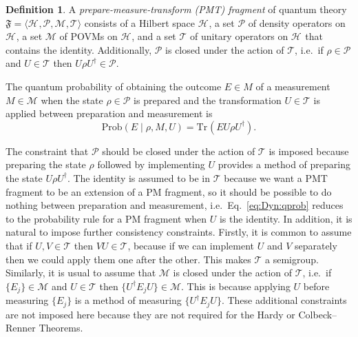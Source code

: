 \documentclass[DIV=calc,fontsize=12pt]{scrartcl} %
\theoremstyle{definition}
\newtheorem{definition}{Definition}[section]
\theoremstyle{plain}
\newcommand{\Hilb}[1][]{\ensuremath{\mathcal{H}_{#1}}}
\newcommand{\Tr}[2][]{\ensuremath{\text{Tr}_{#1} \left ( #2 \right )}}
\begin{document}
\begin{definition}
A \emph{prepare-measure-transform (PMT) fragment} of quantum theory
$\mathfrak{F} = \langle \Hilb, \mathcal{P}, \mathcal{M}, \mathcal{T}
\rangle$ consists of a Hilbert space $\Hilb$, a set $\mathcal{P}$ of
density operators on $\Hilb$, a set $\mathcal{M}$ of POVMs on
$\Hilb$, and a set $\mathcal{T}$ of unitary operators on $\Hilb$
that contains the identity.  Additionally, $\mathcal{P}$ is closed
under the action of $\mathcal{T}$, i.e.\ if $\rho \in \mathcal{P}$
and $U \in \mathcal{T}$ then $U \rho U^{\dagger} \in \mathcal{P}$.

The quantum probability of obtaining the outcome $E \in M$ of a
measurement $M \in \mathcal{M}$ when the state $\rho \in
\mathcal{P}$ is prepared and the transformation $U \in \mathcal{T}$
is applied between preparation and measurement is
\begin{equation}
\label{eq:Dyn:qprob}
\text{Prob} \left ( E \middle | \rho, M, U \right ) = \Tr{E U \rho
U^{\dagger}}.
\end{equation}
\end{definition}

The constraint that $\mathcal{P}$ should be closed under the action of
$\mathcal{T}$ is imposed because preparing the state $\rho$ followed
by implementing $U$ provides a method of preparing the state $U \rho
U^{\dagger}$.  The identity is assumed to be in $\mathcal{T}$ because
we want a PMT fragment to be an extension of a PM fragment, so it
should be possible to do nothing between preparation and measurement,
i.e.\ Eq.~\eqref{eq:Dyn:qprob} reduces to the probability rule for a
PM fragment when $U$ is the identity.  In addition, it is natural to
impose further consistency constraints. Firstly, it is common to
assume that if $U,V \in \mathcal{T}$ then $VU \in \mathcal{T}$,
because if we can implement $U$ and $V$ separately then we could apply
them one after the other.  This makes $\mathcal{T}$ a semigroup.
Similarly, it is usual to assume that $\mathcal{M}$ is closed under
the action of $\mathcal{T}$, i.e.\ if $\{E_j\} \in \mathcal{M}$ and $U
\in \mathcal{T}$ then $\{U^{\dagger} E_j U\} \in \mathcal{M}$.  This
is because applying $U$ before measuring $\{E_j\}$ is a method of
measuring $\{ U^{\dagger} E_j U \}$.  These additional constraints are
not imposed here because they are not required for the Hardy or
Colbeck--Renner Theorems.
\end{document}
